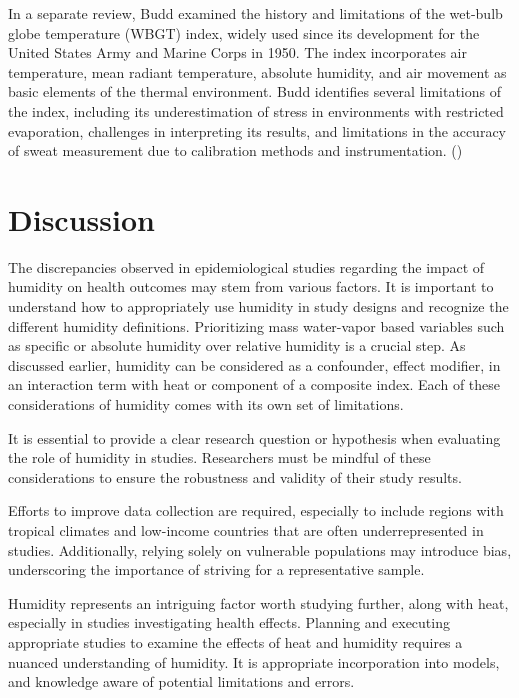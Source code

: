 \documentclass[
]{krantz}
\begin{document}
In a separate review, Budd examined the history and limitations of the wet-bulb globe temperature (WBGT) index, widely used since its development for the United States Army and Marine Corps in 1950. The index incorporates air temperature, mean radiant temperature, absolute humidity, and air movement as basic elements of the thermal environment. Budd identifies several limitations of the index, including its underestimation of stress in environments with restricted evaporation, challenges in interpreting its results, and limitations in the accuracy of sweat measurement due to calibration methods and instrumentation. (\citet{budd2008})

\section{Discussion}\label{discussion-2}

The discrepancies observed in epidemiological studies regarding the impact of humidity on health outcomes may stem from various factors. It is important to understand how to appropriately use humidity in study designs and recognize the different humidity definitions. Prioritizing mass water-vapor based variables such as specific or absolute humidity over relative humidity is a crucial step.
As discussed earlier, humidity can be considered as a confounder, effect modifier, in an interaction term with heat or component of a composite index. Each of these considerations of humidity comes with its own set of limitations.

It is essential to provide a clear research question or hypothesis when evaluating the role of humidity in studies. Researchers must be mindful of these considerations to ensure the robustness and validity of their study results.

Efforts to improve data collection are required, especially to include regions with tropical climates and low-income countries that are often underrepresented in studies. Additionally, relying solely on vulnerable populations may introduce bias, underscoring the importance of striving for a representative sample.

Humidity represents an intriguing factor worth studying further, along with heat, especially in studies investigating health effects. Planning and executing appropriate studies to examine the effects of heat and humidity requires a nuanced understanding of humidity. It is appropriate incorporation into models, and knowledge aware of potential limitations and errors.
\end{document}
